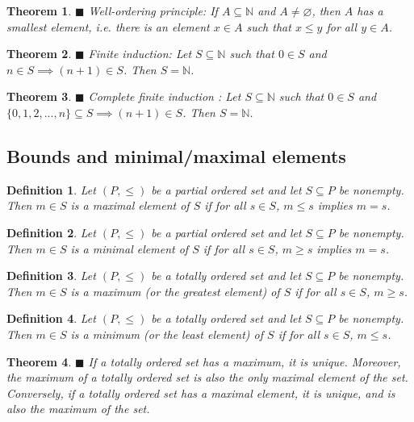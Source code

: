 \documentclass[a4paper]{article}
\newtheorem{mytheorem}{Theorem}
\newtheorem{mydef}{Definition}
\numberwithin{mytheorem}{section}
\numberwithin{mydef}{section}
\numberwithin{axiom}{section}
\numberwithin{example}{section}
\newcommand{\done}{$\blacksquare$ }
\begin{document}
\begin{mytheorem} \done Well-ordering principle: If $A \subseteq \mathbb{N}$ and $A \neq \varnothing$, then $A$ has a smallest element, i.e. there is an element $x \in A$ such that $x \leq y$ for all $y \in A$.
\end{mytheorem}

\begin{mytheorem} \done Finite induction: Let $S \subseteq \mathbb{N}$ such that $0 \in S$ and $n \in S \implies (n+1) \in S$. Then $S = \mathbb{N}$.
\end{mytheorem}

\begin{mytheorem} \done Complete finite induction : Let $S \subseteq \mathbb{N}$ such that $0 \in S$ and $\{0,1,2,...,n\} \subseteq S \implies (n+1) \in S$. Then $S = \mathbb{N}$.
\end{mytheorem}

\subsection{Bounds and minimal/maximal elements}

\begin{mydef} Let $(P, \leq)$ be a partial ordered set and let $S \subseteq P$ be nonempty. Then $m \in S$ is a maximal element of $S$ if for all $s \in S$, $m \leq s$ implies $m = s$. 
\end{mydef}

\begin{mydef} Let $(P, \leq)$ be a partial ordered set and let $S \subseteq P$ be nonempty. Then $m \in S$ is a minimal element of $S$ if for all $s \in S$, $m \geq s$ implies $m = s$. 
\end{mydef}

\begin{mydef} Let $(P, \leq)$ be a totally ordered set and let $S \subseteq P$ be nonempty. Then $m \in S$ is a maximum (or the greatest element) of $S$ if for all $s \in S$, $m \geq s$. 
\end{mydef}

\begin{mydef} Let $(P, \leq)$ be a totally ordered set and let $S \subseteq P$ be nonempty. Then $m \in S$ is a minimum (or the least element) of $S$ if for all $s \in S$, $m \leq s$. 
\end{mydef}

\begin{mytheorem} \done If a totally ordered set has a maximum, it is unique. Moreover, the maximum of a totally ordered set is also the only maximal element of the set. Conversely, if a totally ordered set has a maximal element, it is unique, and is also the maximum of the set.
\end{mytheorem}
\end{document}
